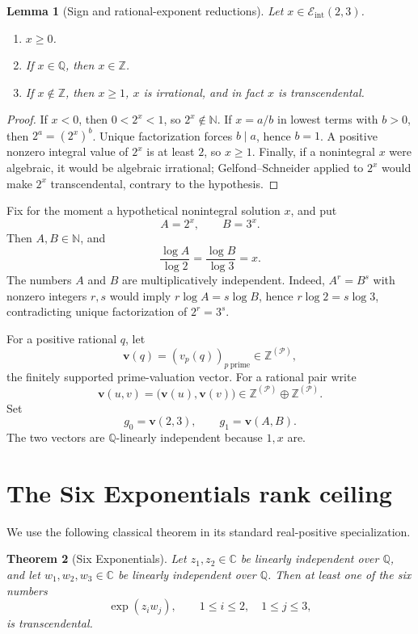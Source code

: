 \documentclass[11pt]{article}
\numberwithin{equation}{section}
\newtheorem{theorem}{Theorem}[section]
\newtheorem{lemma}[theorem]{Lemma}
\theoremstyle{definition}
\newcommand{\Q}{\mathbb{Q}}
\newcommand{\Z}{\mathbb{Z}}
\newcommand{\N}{\mathbb{N}}
\newcommand{\C}{\mathbb{C}}
\newcommand{\val}{\boldsymbol{v}}
\newcommand{\Eint}{\mathcal E_{\mathrm{int}}}
\begin{document}
\begin{lemma}[Sign and rational-exponent reductions]\label{lem:elementary}
Let \(x\in\Eint(2,3)\).
\begin{enumerate}[label=\textup{(\roman*)}]
\item \(x\ge0\).
\item If \(x\in\Q\), then \(x\in\Z\).
\item If \(x\notin\Z\), then \(x\ge1\), \(x\) is irrational, and in fact \(x\) is transcendental.
\end{enumerate}
\end{lemma}

\begin{proof}
If \(x<0\), then \(0<2^x<1\), so \(2^x\notin\N\). If \(x=a/b\) in lowest terms with \(b>0\), then \(2^a=(2^x)^b\). Unique factorization forces \(b\mid a\), hence \(b=1\). A positive nonzero integral value of \(2^x\) is at least \(2\), so \(x\ge1\). Finally, if a nonintegral \(x\) were algebraic, it would be algebraic irrational; Gelfond--Schneider applied to \(2^x\) would make \(2^x\) transcendental, contrary to the hypothesis.
\end{proof}

Fix for the moment a hypothetical nonintegral solution \(x\), and put
\[
  A=2^x,\qquad B=3^x.
\]
Then \(A,B\in\N\), and
\[
   \frac{\log A}{\log 2}=\frac{\log B}{\log 3}=x.
\]
The numbers \(A\) and \(B\) are multiplicatively independent. Indeed, \(A^r=B^s\) with nonzero integers \(r,s\) would imply
\(
 r\log A=s\log B
\), hence \(r\log2=s\log3\), contradicting unique factorization of \(2^r=3^s\).

For a positive rational \(q\), let
\[
  \val(q)=(v_p(q))_{p\ \mathrm{prime}}\in\Z^{(\mathcal P)},
\]
the finitely supported prime-valuation vector. For a rational pair write
\[
  \val(u,v)=\bigl(\val(u),\val(v)\bigr)
       \in \Z^{(\mathcal P)}\oplus\Z^{(\mathcal P)}.
\]
Set
\[
  g_0=\val(2,3),\qquad g_1=\val(A,B).
\]
The two vectors are \(\Q\)-linearly independent because \(1,x\) are.

\section{The Six Exponentials rank ceiling}

We use the following classical theorem in its standard real-positive specialization.

\begin{theorem}[Six Exponentials]\label{thm:sixexp}
Let \(z_1,z_2\in\C\) be linearly independent over \(\Q\), and let \(w_1,w_2,w_3\in\C\) be linearly independent over \(\Q\). Then at least one of the six numbers
\[
       \exp(z_iw_j),\qquad 1\le i\le2,\quad 1\le j\le3,
\]
is transcendental.
\end{theorem}
\end{document}
